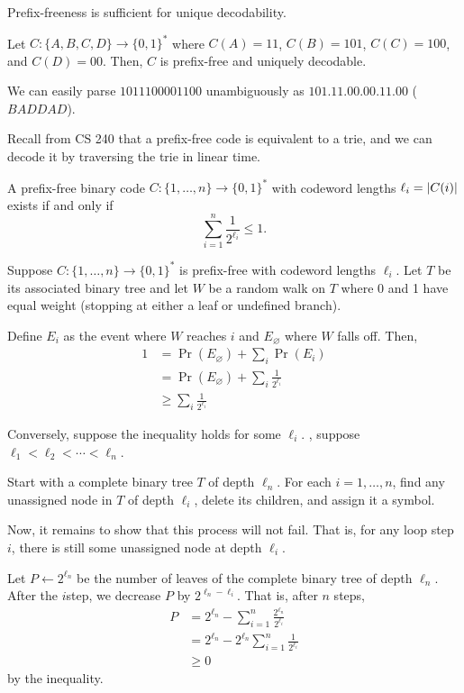 \documentclass[notes,tikz]{agony}
\begin{document}
\begin{prop}
  Prefix-freeness is sufficient for unique decodability.
\end{prop}

\begin{example}
  Let $C : \{A,B,C,D\} \to \{0,1\}^*$ where
  $C(A) = 11$, $C(B) = 101$, $C(C) = 100$, and $C(D) = 00$.
  Then, $C$ is prefix-free and uniquely decodable.

  We can easily parse $1011100001100$ unambiguously as $101.11.00.00.11.00$
  ($BADDAD$).
\end{example}

Recall from CS 240 that a prefix-free code is equivalent to a trie,
and we can decode it by traversing the trie in linear time.

\begin{theorem}
  A prefix-free binary code $C : \{1,\dotsc,n\} \to \{0,1\}^*$
  with codeword lengths $\ell_i = \abs{C(i)}$ exists if and only if
  \[ \sum_{i=1}^n \frac{1}{2^{\ell_i}} \leq 1. \]
\end{theorem}
\begin{prf}
  Suppose $C : \{1,\dotsc,n\} \to \{0,1\}^*$ is prefix-free
  with codeword lengths $\ell_i$.
  Let $T$ be its associated binary tree
  and let $W$ be a random walk on $T$ where 0 and 1 have equal weight
  (stopping at either a leaf or undefined branch).

  Define $E_i$ as the event where $W$ reaches $i$ and
  $E_\varnothing$ where $W$ falls off. Then,
  \begin{align*}
    1 & = \Pr(E_\varnothing) + \sum_i \Pr(E_i)                                   \\
      & = \Pr(E_\varnothing) + \sum_i \frac{1}{2^{\ell_i}} \tag{by independence} \\
      & \geq \sum_i \frac{1}{2^{\ell_i}} \tag{probabilities are non-negative}
  \end{align*}

  Conversely, suppose the inequality holds for some $\ell_i$.
  \WLOG, suppose $\ell_1 < \ell_2 < \dotsb < \ell_n$.

  Start with a complete binary tree $T$ of depth $\ell_n$.
  For each $i = 1,\dotsc,n$, find any unassigned node in $T$ of depth $\ell_i$,
  delete its children, and assign it a symbol.

  Now, it remains to show that this process will not fail.
  That is, for any loop step $i$, there is still some unassigned node at depth $\ell_i$.

  Let $P \gets 2^{\ell_n}$ be the number of leaves
  of the complete binary tree of depth $\ell_n$.
  After the $i$\xth step, we decrease $P$ by $2^{\ell_n - \ell_i}$.
  That is, after $n$ steps,
  \begin{align*}
    P & = 2^{\ell_n} - \sum_{i=1}^n \frac{2^{\ell_n}}{2^{\ell_i}}   \\
      & = 2^{\ell_n} - 2^{\ell_n} \sum_{i=1}^n \frac{1}{2^{\ell_i}} \\
      & \geq 0
  \end{align*}
  by the inequality.
\end{prf}
\end{document}
